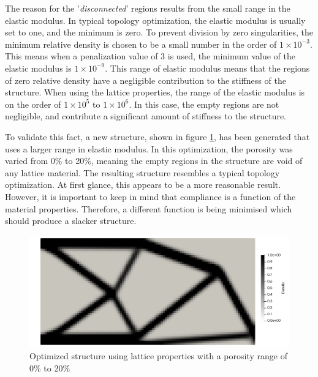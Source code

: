 The reason for the '\emph{disconnected}' regions results from the small range in the elastic modulus. In typical topology optimization, the elastic modulus is usually set to one, and the minimum is zero. To prevent division by zero singularities, the minimum relative density is chosen to be a small number in the order of $1\times10^{-3}$. This means when a penalization value of 3 is used, the minimum value of the elastic modulus is $1\times10^{-9}$. This range of elastic modulus means that the regions of zero relative density have a negligible contribution to the stiffness of the structure. When using the lattice properties, the range of the elastic modulus is on the order of $1\times10^5$ to $1\times10^6$. In this case, the empty regions are not negligible, and contribute a significant amount of stiffness to the structure.

To validate this fact, a new structure, shown in figure \ref{fig:structure_opt_0to20}, has been generated that uses a larger range in elastic modulus. In this optimization, the porosity was varied from 0\% to 20\%, meaning the empty regions in the structure are void of any lattice material. The resulting structure resembles a typical topology optimization. At first glance, this appears to be a more reasonable result. However, it is important to keep in mind that compliance is a function of the material properties. Therefore, a different function is being minimised which should produce a slacker structure.
\begin{figure}[ht]
  \centering
  \includegraphics[width=0.9\linewidth]{figures/chapter_4/StructuralOptLattice0to20.png}
  \caption{Optimized structure using lattice properties with a porosity range of 0\% to 20\%}
  \label{fig:structure_opt_0to20}
\end{figure}

